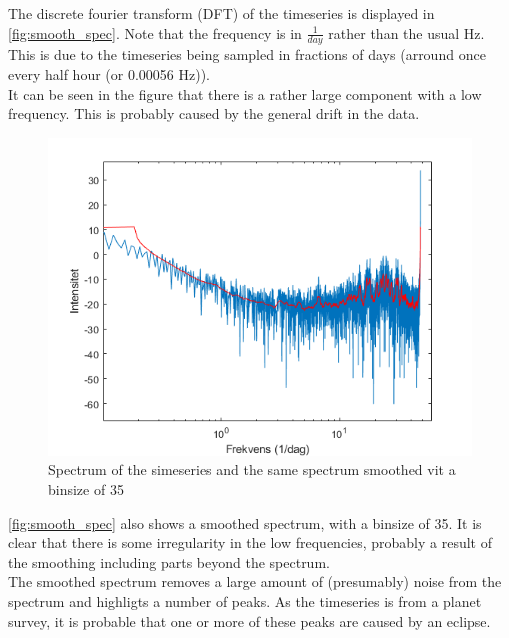 The discrete fourier transform (DFT) of the timeseries is displayed in \autoref{fig:smooth_spec}. Note that the frequency is in $\frac{1}{day}$ rather than the usual Hz. This is due to the timeseries being sampled in fractions of days (arround once every half hour (or 0.00056 Hz)).\\
It can be seen in the figure that there is a rather large component with a low frequency. This is probably caused by the general drift in the data.\\ 

\begin{figure}[h]
    \centering
    \includegraphics[width = \textwidth]{smooth_spectrum.png}
    \caption{Spectrum of the simeseries and the same spectrum smoothed vit a binsize of 35}
    \label{fig:smooth_spec}
\end{figure}

\autoref{fig:smooth_spec} also shows a smoothed spectrum, with a binsize of 35. It is clear that there is some irregularity in the low frequencies, probably a result of the smoothing including parts beyond the spectrum.\\

The smoothed spectrum removes a large amount of (presumably) noise from the spectrum and highligts a number of peaks. As the timeseries is from a planet survey, it is probable that one or more of these peaks are caused by an eclipse.

\newpage
